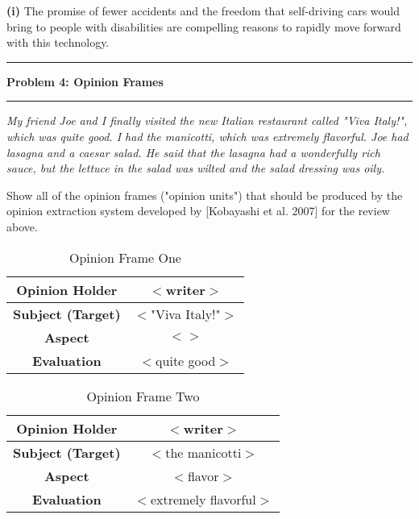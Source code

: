 \documentclass[11pt]{article}
\newcommand\question[2]{\vspace{.25in}\hrule\textbf{#1: #2}\vspace{.5em}\hrule\vspace{.10in}}
\renewcommand\part[1]{\vspace{.10in}\textbf{(#1)}}
\begin{document}

\part{i} The promise of fewer accidents and the freedom that self-driving cars would bring to people with disabilities are compelling reasons to rapidly move forward with this technology.


\question{Problem 4}{Opinion Frames}

\textit{My friend Joe and I finally visited the new Italian restaurant called "Viva Italy!", which was quite good. I had the manicotti, which was extremely flavorful. Joe had lasagna and a caesar salad. He said that the lasagna had a wonderfully rich sauce, but the lettuce in the salad was wilted and the salad dressing was oily.} \newline

Show all of the opinion frames ("opinion units") that should be produced by the opinion extraction system developed by [Kobayashi et al. 2007] for the review above.

 \begin{table}[H]
\centering
{\renewcommand{\arraystretch}{1.2}%
\begin{tabular}{| c | c |}
\hline
\textbf{Opinion Holder} & $<$writer$>$\\ \hline
\textbf{Subject (Target)} & $<$"Viva Italy!"$>$ \\ \hline
\textbf{Aspect} & $<$$>$ \\ \hline
\textbf{Evaluation} & $<$quite good$>$ \\ \hline
\end{tabular}}
\caption{Opinion Frame One}
\end{table}

 \begin{table}[H]
\centering
{\renewcommand{\arraystretch}{1.2}%
\begin{tabular}{| c | c |}
\hline
\textbf{Opinion Holder} & $<$writer$>$\\ \hline
\textbf{Subject (Target)} & $<$the manicotti$>$ \\ \hline
\textbf{Aspect} & $<$flavor$>$ \\ \hline
\textbf{Evaluation} & $<$extremely flavorful$>$ \\ \hline
\end{tabular}}
\caption{Opinion Frame Two}
\end{table}
\end{document}

